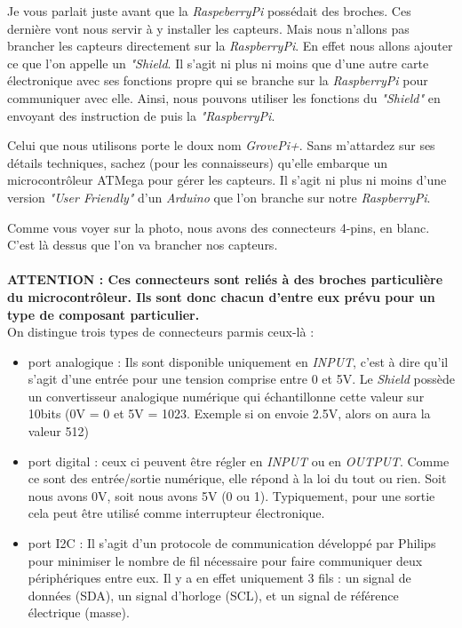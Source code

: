 Je vous parlait juste avant que la \textit{RaspeberryPi} possédait des broches. Ces dernière vont nous servir à y installer les capteurs. Mais nous n'allons pas brancher les capteurs directement sur la \textit{RaspberryPi}. En effet nous allons ajouter ce que l'on appelle un \textit{"Shield}. Il s'agit ni plus ni moins que d'une autre carte électronique avec ses fonctions propre qui se branche sur la \textit{RaspberryPi} pour communiquer avec elle. Ainsi, nous pouvons utiliser les fonctions du \textit{"Shield"} en envoyant des instruction de puis la \textit{"RaspberryPi}.

Celui que nous utilisons porte le doux nom \textit{GrovePi+}. Sans m'attardez sur ses détails techniques, sachez (pour les connaisseurs) qu'elle embarque un microcontrôleur ATMega pour gérer les capteurs. Il s'agit ni plus ni moins d'une version \textit{"User Friendly"} d'un \textit{Arduino} que l'on branche sur notre \textit{RaspberryPi}.

Comme vous voyer sur la photo, nous avons des connecteurs 4-pins, en blanc. C'est là dessus que l'on va brancher nos capteurs.\\
\\
\textbf{ATTENTION : Ces connecteurs sont reliés à des broches particulière du microcontrôleur. Ils sont donc chacun d'entre eux prévu pour un type de composant particulier. } \\

On distingue trois types de connecteurs parmis ceux-là :

\begin{itemize}
	\item port analogique : Ils sont disponible uniquement en \textit{INPUT}, c'est à dire qu'il s'agit d'une entrée pour une tension comprise entre 0 et 5V. Le \textit{Shield} possède un convertisseur analogique numérique qui échantillonne cette valeur sur 10bits (0V = 0 et 5V = 1023. Exemple si on envoie 2.5V, alors on aura la valeur 512)
	
	\item port digital : ceux ci peuvent être régler en \textit{INPUT} ou en \textit{OUTPUT}. Comme ce sont des entrée/sortie numérique, elle répond à la loi du tout ou rien. Soit nous avons 0V, soit nous avons 5V (0 ou 1). Typiquement, pour une sortie cela peut être utilisé comme interrupteur électronique.
	\item port I2C : Il s'agit d'un protocole de communication développé par Philips pour minimiser le nombre de fil nécessaire pour faire communiquer deux périphériques entre eux. Il y a en effet uniquement 3 fils : un signal de données (SDA), un signal d'horloge (SCL), et un signal de référence électrique (masse).
\end{itemize}


